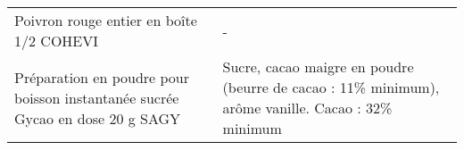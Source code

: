 \begin{longtable}{p{5cm}p{10cm}}
                                                                 Poivron rouge entier en boîte 1/2 COHEVI &                                                                                                                                                                                                                                                                                                                                                                                                                                                                                                                                                                                                                                                                                                                                                                                                                                                                                                                                                                                                                                        - \\
                            Préparation en poudre pour boisson instantanée sucrée Gycao en dose 20 g SAGY &                                                                                                                                                                                                                                                                                                                                                                                                                                                                                                                                                                                                                                                                                                                                                                                                                                                                                                                                       Sucre, cacao maigre en poudre (beurre de cacao : 11\% minimum), arôme vanille.  Cacao : 32\% minimum \\

\end{longtable}

